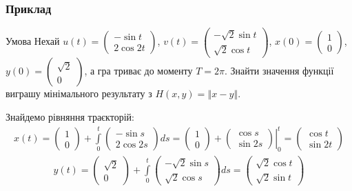 \documentclass[10pt,pdf]{beamer}
\renewcommand{\l}{\left}
\renewcommand{\r}{\right}
\newcommand{\norm}[1]{\left\Vert #1 \right\Vert}
\newcommand{\intl}{\int\limits}
\begin{document}
    \begin{frame}
        \frametitle{Приклад}
        \begin{block}{Умова}
            Нехай $u(t) = \begin{pmatrix} -\sin t \\ 2 \cos {2t}\end{pmatrix}$, 
            $v(t) = \begin{pmatrix} -\sqrt{2}\sin t \\ \sqrt{2}\cos t \end{pmatrix}$,
            $x(0) = \begin{pmatrix} 1 \\ 0 \end{pmatrix}$, 
            $y(0) = \begin{pmatrix} \sqrt{2} \\ 0 \end{pmatrix}$, 
            а гра триває до моменту $T = 2\pi$.
            Знайти значення функції виграшу мінімального результату з $H(x, y) = \norm{x - y}$.    
        \end{block}
        Знайдемо рівняння траєкторій:
        \begin{gather*}
            x(t) = \begin{pmatrix} 1 \\ 0 \end{pmatrix} +
            \intl_0^t \begin{pmatrix} -\sin s \\ 2 \cos {2s} \end{pmatrix} ds = 
            \begin{pmatrix} 1 \\ 0 \end{pmatrix} +
            \l.\begin{pmatrix} \cos s \\ \sin{2s} \end{pmatrix}\r|_0^t = 
            \begin{pmatrix} \cos t \\ \sin{2t} \end{pmatrix}
        \end{gather*}
        \begin{gather*}
            y(t) = \begin{pmatrix} \sqrt{2} \\ 0 \end{pmatrix} +
            \intl_0^t \begin{pmatrix} -\sqrt{2}\sin s \\ \sqrt{2}\cos s  \end{pmatrix} ds = 
            \begin{pmatrix} \sqrt{2}\cos t \\ \sqrt{2}\sin t \end{pmatrix}
        \end{gather*}
    \end{frame}
\end{document}
